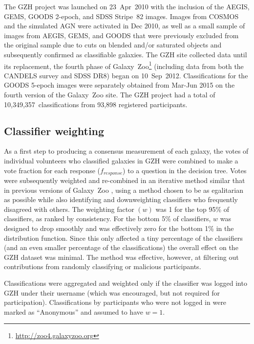 \documentclass[twocolumn]{aastex6}
\begin{document}
The GZH project was launched on 23~Apr~2010 with the inclusion of the AEGIS,
GEMS, GOODS 2-epoch, and SDSS Stripe~82 images. Images from COSMOS and the
simulated AGN were activated in Dec 2010, as well as a small sample of images
from AEGIS, GEMS, and GOODS that were previously excluded from the original
sample due to cuts on blended and/or saturated objects and subsequently
confirmed as classifiable galaxies. The GZH site collected data until its
replacement, the fourth phase of
Galaxy~Zoo\footnote{\url{http://zoo4.galaxyzoo.org}} (including data from both
the \hst{} CANDELS survey and SDSS DR8) began on 10~Sep~2012. Classifications
for the GOODS 5-epoch images were separately obtained from Mar-Jun 2015 on the
fourth version of the Galaxy~Zoo site. The GZH project had a total of
10,349,357~classifications from 93,898 registered participants. 


\subsection{Classifier weighting}\label{ssec:weighting}

As a first step to producing a consensus measurement of each galaxy, the votes
of individual volunteers who classified galaxies in GZH were combined to make a
vote fraction for each response ($f_{response}$) to a question in the decision
tree. Votes were subsequently weighted and re-combined in an iterative method
similar that in previous versions of Galaxy~Zoo \citep{lan08,wil13}, using a
method chosen to be as egalitarian as possible while also identifying and
downweighting classifiers who frequently disagreed with others. The weighting
factor $(w)$ was 1 for the top 95\% of classifiers, as ranked by consistency.
For the bottom 5\% of classifiers, $w$ was designed to drop smoothly and was
effectively zero for the bottom 1\% in the distribution function. Since this
only affected a tiny percentage of the classifiers (and an even smaller
percentage of the classifications) the overall effect on the GZH dataset was
minimal. The method was effective, however, at filtering out contributions from
randomly classifying or malicious participants.

Classifications were aggregated and weighted only if the classifier was logged
into GZH under their username (which was encouraged, but not required for
participation). Classifications by participants who were not logged in were marked as
``Anonymous'' and assumed to have $w = 1$. 
\end{document}
